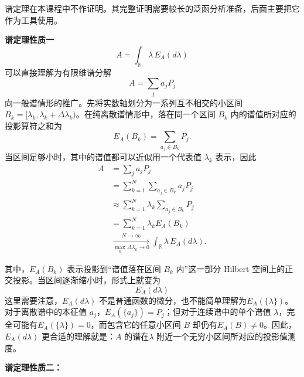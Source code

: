 \documentclass[UTF8,a4paper,11pt,openany]{ctexbook}
\begin{document}
谱定理在本课程中不作证明。其完整证明需要较长的泛函分析准备，后面主要把它作为工具使用。

\textbf{谱定理性质一}
\[
A=\int_{\mathbb R}\lambda\,E_A(d\lambda)
\]
可以直接理解为有限维谱分解
\[
A=\sum_j a_jP_j
\]
向一般谱情形的推广。先将实数轴划分为一系列互不相交的小区间
$B_k=[\lambda_k,\lambda_k+\Delta\lambda_k)$。在纯离散谱情形中，落在同一个区间 $B_k$ 内的谱值所对应的投影算符之和为
\[
E_A(B_k)
=
\sum_{a_j\in B_k}P_j.
\]
当区间足够小时，其中的谱值都可以近似用一个代表值
$\lambda_k$ 表示，因此
\begin{align}
    A
    &=\sum_j a_jP_j
    \nonumber\\
    &=\sum_{k=1}^{N}\sum_{a_j\in B_k}a_jP_j
    \nonumber\\
    &\approx
    \sum_{k=1}^{N}\lambda_k\sum_{a_j\in B_k}P_j
    \nonumber\\
    &=\sum_{k=1}^{N}\lambda_k E_A(B_k)
    \nonumber\\
    &\xrightarrow[\max_k\Delta\lambda_k\to0]{N\to\infty}
    \int_{\mathbb R}\lambda\,E_A(d\lambda).
\end{align}

其中，$E_A(B_k)$ 表示投影到“谱值落在区间 $B_k$ 内”这一部分 Hilbert 空间上的正交投影。当区间逐渐缩小时，形式上就变为
\[
E_A(d\lambda)
\]
这里需要注意，$E_A(d\lambda)$ 不是普通函数的微分，也不能简单理解为$E_A(\{\lambda\})$。对于离散谱中的本征值 $a_j$，$E_A(\{a_j\})=P_j$；但对于连续谱中的单个谱值 $\lambda$，完全可能有$E_A(\{\lambda\})=0$，而包含它的任意小区间 $B$ 却仍有$E_A(B)\neq0$。因此，$E_A(d\lambda)$ 更合适的理解就是：$A$ 的谱在$\lambda$ 附近一个无穷小区间所对应的投影值测度。

\textbf{谱定理性质二：}
\end{document}
